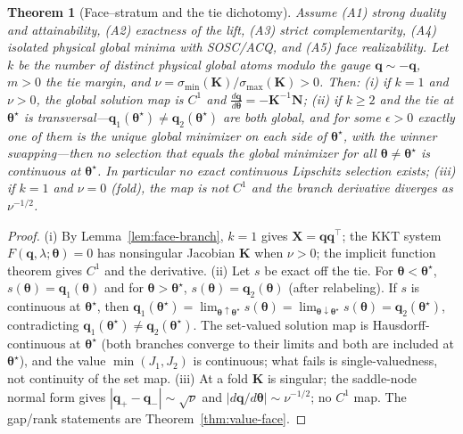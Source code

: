 \documentclass[conference]{IEEEtran}
\newtheorem{theorem}{Theorem}
\newcommand{\bq}{\bm{q}}
\newcommand{\bth}{\bm{\theta}}
\newcommand{\bK}{\bm{K}}
\newcommand{\bX}{\bm{X}}
\newcommand{\bN}{\bm{N}}
\begin{document}
\begin{theorem}[Face--stratum and the tie dichotomy]
\label{thm:face-stratum}
Assume (A1) strong duality and attainability, (A2) exactness of the lift, (A3) strict complementarity, (A4) isolated physical global minima with SOSC/ACQ, and (A5) face realizability. Let $k$ be the number of distinct physical global atoms modulo the gauge $\bq\sim-\bq$, $m>0$ the tie margin, and $\nu=\sigma_{\min}(\bK)/\sigma_{\max}(\bK)>0$. Then:
(i) if $k=1$ and $\nu>0$, the global solution map is $C^1$ and $\frac{d\bq}{d\bth}=-\bK^{-1}\bN$;
(ii) if $k\ge2$ and the tie at $\bth^\star$ is \emph{transversal}---$\bq_1(\bth^\star)\ne\bq_2(\bth^\star)$ are both global, and for some $\epsilon>0$ exactly one of them is the unique global minimizer on each side of $\bth^\star$, with the winner swapping---then no selection that equals the global minimizer for all $\bth\ne\bth^\star$ is continuous at $\bth^\star$. In particular no exact continuous Lipschitz selection exists;
(iii) if $k=1$ and $\nu=0$ (fold), the map is not $C^1$ and the branch derivative diverges as $\nu^{-1/2}$.
\end{theorem}
\begin{proof}
(i) By Lemma~\ref{lem:face-branch}, $k=1$ gives $\bX=\bq\bq^\top$; the KKT system $F(\bq,\lambda;\bth)=0$ has nonsingular Jacobian $\bK$ when $\nu>0$; the implicit function theorem gives $C^1$ and the derivative. (ii) Let $s$ be exact off the tie. For $\bth<\bth^\star$, $s(\bth)=\bq_1(\bth)$ and for $\bth>\bth^\star$, $s(\bth)=\bq_2(\bth)$ (after relabeling). If $s$ is continuous at $\bth^\star$, then $\bq_1(\bth^\star)=\lim_{\bth\uparrow\bth^\star}s(\bth)=\lim_{\bth\downarrow\bth^\star}s(\bth)=\bq_2(\bth^\star)$, contradicting $\bq_1(\bth^\star)\ne\bq_2(\bth^\star)$. The set-valued solution map is Hausdorff-continuous at $\bth^\star$ (both branches converge to their limits and both are included at $\bth^\star$), and the value $\min(J_1,J_2)$ is continuous; what fails is single-valuedness, not continuity of the set map. (iii) At a fold $\bK$ is singular; the saddle-node normal form gives $|\bq_+-\bq_-|\sim\sqrt{\nu}$ and $|d\bq/d\bth|\sim\nu^{-1/2}$; no $C^1$ map. The gap/rank statements are Theorem~\ref{thm:value-face}.
\end{proof}
\end{document}
